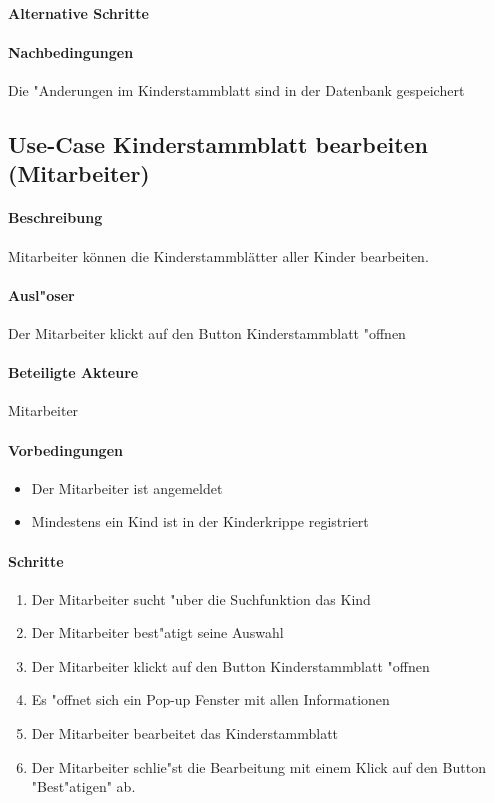   \paragraph{Alternative Schritte}
  \paragraph{Nachbedingungen}
  Die "Anderungen im Kinderstammblatt sind in der Datenbank gespeichert
  
  
  \newpage
  \subsection{Use-Case Kinderstammblatt bearbeiten (Mitarbeiter)}
  \paragraph{Beschreibung}
  Mitarbeiter können die Kinderstammblätter aller Kinder bearbeiten. 
  \paragraph{Ausl"oser}
  Der Mitarbeiter klickt auf den Button \dq Kinderstammblatt "offnen\dq
  \paragraph{Beteiligte Akteure}   \leavevmode \newline
  Mitarbeiter
  \paragraph{Vorbedingungen}
  \begin{itemize}
  	\item Der Mitarbeiter ist angemeldet
  	\item Mindestens ein Kind ist in der Kinderkrippe registriert
  \end{itemize}
  
  \paragraph{Schritte}
  \begin{enumerate}
  	\item Der Mitarbeiter sucht "uber die Suchfunktion das Kind
  	\item Der Mitarbeiter best"atigt seine Auswahl
  	\item Der Mitarbeiter klickt auf den Button \dq Kinderstammblatt "offnen\dq
  	\item Es "offnet sich ein Pop-up Fenster mit allen Informationen
  	\item Der Mitarbeiter bearbeitet das Kinderstammblatt
  	\item Der Mitarbeiter schlie"st die Bearbeitung mit einem Klick auf den Button "Best"atigen" ab. 
  \end{enumerate}
  
